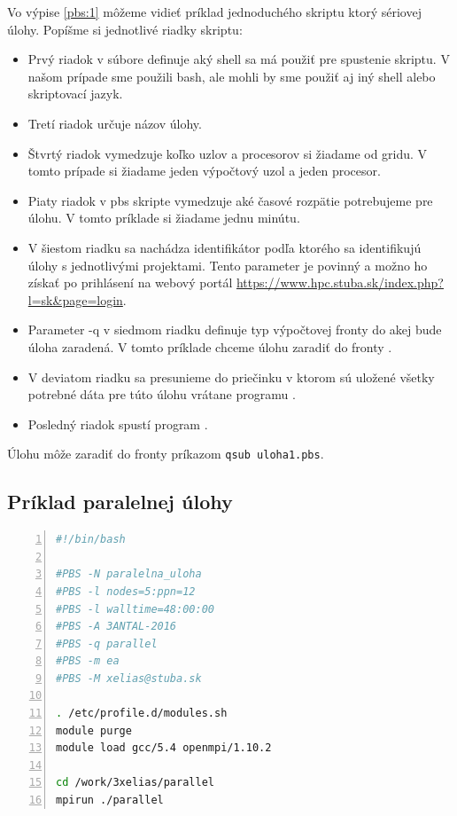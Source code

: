 Vo výpise \ref{pbs:1} môžeme vidieť príklad jednoduchého skriptu ktorý sériovej úlohy.
Popíšme si jednotlivé riadky skriptu:
\begin{itemize}
\item
  Prvý riadok v súbore definuje aký shell sa má použiť pre spustenie skriptu.
  V našom prípade sme použili \acrshort{bash}, ale mohli by sme použiť aj iný shell alebo skriptovací jazyk.
\item
  Tretí riadok určuje názov úlohy.
\item
  Štvrtý riadok vymedzuje koľko uzlov a procesorov si žiadame od gridu.
  V tomto prípade si žiadame jeden výpočtový uzol a jeden procesor.
\item
  Piaty riadok v \acrshort{pbs} skripte vymedzuje aké časové rozpätie potrebujeme pre úlohu.
  V tomto príklade si žiadame jednu minútu.
\item
  V šiestom riadku sa nachádza identifikátor podľa ktorého sa identifikujú úlohy s jednotlivými projektami.
  Tento parameter je povinný a možno ho získať po prihlásení na webový portál \url{https://www.hpc.stuba.sk/index.php?l=sk&page=login}.
\item
  Parameter -q v siedmom riadku definuje typ výpočtovej fronty do akej bude úloha zaradená.
  V tomto príklade chceme úlohu zaradiť do fronty .
\item
  V deviatom riadku sa presunieme do priečinku v ktorom sú uložené všetky potrebné dáta pre túto úlohu vrátane programu .
\item
  Posledný riadok spustí program .
\end{itemize}
Úlohu môže zaradiť do fronty príkazom \texttt{qsub uloha1.pbs}.

\subsection{Príklad paralelnej úlohy}
\begin{lstlisting}[language=bash, caption={uloha2.pbs}, label={pbs:2}, numbers=left]
#!/bin/bash

#PBS -N paralelna_uloha
#PBS -l nodes=5:ppn=12
#PBS -l walltime=48:00:00  
#PBS -A 3ANTAL-2016
#PBS -q parallel
#PBS -m ea
#PBS -M xelias@stuba.sk

. /etc/profile.d/modules.sh
module purge
module load gcc/5.4 openmpi/1.10.2

cd /work/3xelias/parallel
mpirun ./parallel
\end{lstlisting}

